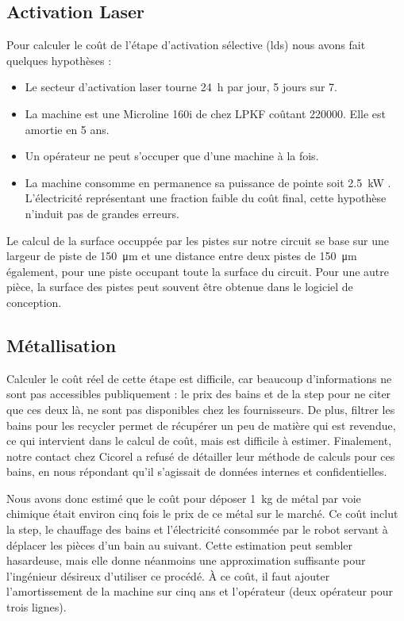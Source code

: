 \subsection{Activation Laser}
Pour calculer le coût de l'étape d'activation sélective (\gls{lds}) nous avons fait quelques hypothèses :
\begin{itemize}
    \item Le secteur d'activation laser tourne \SI{24}{\hour} par jour, 5 jours sur 7.
    \item La machine est une Microline 160i de chez LPKF coûtant \SI{220000}{\chf}.
        Elle est amortie en 5 ans.
    \item Un opérateur ne peut s'occuper que d'une machine à la fois.
    \item La machine consomme en permanence sa puissance de pointe soit \SI{2.5}{\kilo\watt} \cite{lpkf-microline-series}.
        L'électricité représentant une fraction faible du coût final, cette hypothèse n'induit pas de grandes erreurs.
\end{itemize}

Le calcul de la surface occuppée par les pistes sur notre circuit se base sur une largeur de piste de \SI{150}{\micro\meter} et une
distance entre deux pistes de \SI{150}{\micro\meter} également, pour une piste occupant toute la surface du circuit.
Pour une autre pièce, la surface des pistes peut souvent être obtenue dans le logiciel de conception.



\subsection{Métallisation}
Calculer le coût réel de cette étape est difficile, car beaucoup d'informations ne sont pas accessibles publiquement : le prix des bains et de la \gls{step} pour ne citer que ces deux là, ne sont pas disponibles chez les fournisseurs.
De plus, filtrer les bains pour les recycler permet de récupérer un peu de matière qui est revendue, ce qui intervient dans le calcul de coût, mais est difficile à estimer.
Finalement, notre contact chez Cicorel a refusé de détailler leur méthode de calculs pour ces bains, en nous répondant qu'il s'agissait de données internes et confidentielles.

Nous avons donc estimé que le coût pour déposer \SI{1}{\kilogram} de métal par voie chimique était environ cinq fois le prix de ce métal sur le marché.
Ce coût inclut la \gls{step}, le chauffage des bains et l'électricité consommée par le robot servant à déplacer les pièces d'un bain au suivant. 
Cette estimation peut sembler hasardeuse, mais elle donne néanmoins une approximation suffisante pour l'ingénieur désireux d'utiliser ce procédé.
À ce coût, il faut ajouter l'amortissement de la machine sur cinq ans et l'opérateur (deux opérateur pour trois lignes).

